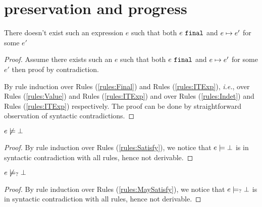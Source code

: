 \section{preservation and progress}

\begin{lem}[Finality]
  \label{lem:finality}
  There doesn't exist such an expression $e$ such that both $e ~\mathtt{final}$ and $e \mapsto e'$ for some $e'$
\end{lem}
\begin{proof}Assume there exists such an $e$ such that both $e ~\mathtt{final}$ and $e \mapsto e'$ for some $e'$ then proof by contradiction.
 
  By rule induction over Rules (\ref{rules:Final}) and Rules (\ref{rules:ITExp}), \textit{i.e.}, over Rules (\ref{rules:Value}) and Rules (\ref{rules:ITExp}) and over Rules (\ref{rules:Indet}) and Rules (\ref{rules:ITExp}) respectively. The proof can be done by straightforward observation of syntactic contradictions.
\end{proof}

\begin{lem}
  \label{lem:no-e-satisfy-falsity}
  $e \not\models \bot$
\end{lem}
\begin{proof}
  By rule induction over Rules (\ref{rules:Satisfy}), we notice that $e \models \bot$ is in syntactic contradiction with all rules, hence not derivable.
\end{proof}

\begin{lem}
  \label{lem:no-e-may-satisfy-falsity}
  $e \not\models_{?} \bot$
\end{lem}
\begin{proof}
  By rule induction over Rules (\ref{rules:MaySatisfy}), we notice that $e \models_{?} \bot$ is in syntactic contradiction with all rules, hence not derivable.
\end{proof}

